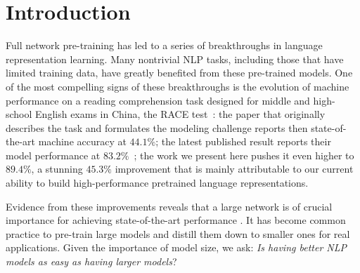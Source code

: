 \section{Introduction}
Full network pre-training \citep{dai2015semi,radford2018improving, devlin2018bert,howard2018universal} has led to a series of breakthroughs in language representation learning. Many nontrivial NLP tasks, including those that have limited training data, have greatly benefited from these pre-trained models. One of the most compelling signs of these breakthroughs is the evolution of machine performance on a reading comprehension task designed for middle and high-school English exams in China, the RACE test~\citep{lai2017race}: the paper that originally describes the task and formulates the modeling challenge reports then state-of-the-art machine accuracy at $44.1\%$; the latest published result reports their model performance at $83.2\%$~\citep{liu2019roberta}; the work we present here pushes it even higher to $89.4\%$, a stunning $45.3\%$ improvement that is mainly attributable to our current ability to build high-performance pretrained language representations.




Evidence from these improvements reveals that a large network is of crucial importance for achieving state-of-the-art performance \citep{devlin2018bert, radford2019language}. It has become common practice to pre-train large models and distill them down to smaller ones \citep{sun2019patient, turc2019well} for real applications. Given the importance of model size, we ask: \textit{Is having better NLP models as easy as having larger models}? 







